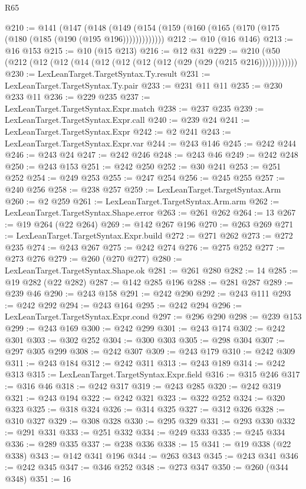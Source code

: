 \begin{lexlean}{R65}
\begin{coremodule}
@210 := @141
    (@147 (@148 (@149 (@154 (@159 (@160 (@165 (@170 (@175 (@180 (@185 (@190 (@195 @196)))))))))))))
@212 := @10 (@16 @146)
@213 := @16 @153
@215 := @10 (@15 @213)
@216 := @12 @31
@229 := @210 (@50 (@212 (@12 (@12 (@14 (@12 (@12 (@12 (@12 (@29 (@29 (@215 @216))))))))))))
@230 := LexLeanTarget.TargetSyntax.Ty.result
@231 := LexLeanTarget.TargetSyntax.Ty.pair
@233 := @231 @11 @11
@235 := @230 @233 @11
@236 := @229 @235
@237 := LexLeanTarget.TargetSyntax.Expr.match
@238 := @237 @235
@239 := LexLeanTarget.TargetSyntax.Expr.call
@240 := @239 @24
@241 := LexLeanTarget.TargetSyntax.Expr
@242 := @2 @241
@243 := LexLeanTarget.TargetSyntax.Expr.var
@244 := @243 @146
@245 := @242 @244
@246 := @243 @24
@247 := @242 @246
@248 := @243 @46
@249 := @242 @248
@250 := @243 @153
@251 := @242 @250
@252 := @30 @241
@253 := @251 @252
@254 := @249 @253
@255 := @247 @254
@256 := @245 @255
@257 := @240 @256
@258 := @238 @257
@259 := LexLeanTarget.TargetSyntax.Arm
@260 := @2 @259
@261 := LexLeanTarget.TargetSyntax.Arm.arm
@262 := LexLeanTarget.TargetSyntax.Shape.error
@263 := @261 @262
@264 := 13
@267 := @19 @264 (@22 @264)
@269 := @142 @267 @196
@270 := @263 @269
@271 := LexLeanTarget.TargetSyntax.Expr.build
@272 := @271 @262
@273 := @272 @235
@274 := @243 @267
@275 := @242 @274
@276 := @275 @252
@277 := @273 @276
@279 := @260 (@270 @277)
@280 := LexLeanTarget.TargetSyntax.Shape.ok
@281 := @261 @280
@282 := 14
@285 := @19 @282 (@22 @282)
@287 := @142 @285 @196
@288 := @281 @287
@289 := @239 @46
@290 := @243 @158
@291 := @242 @290
@292 := @243 @111
@293 := @242 @292
@294 := @243 @164
@295 := @242 @294
@296 := LexLeanTarget.TargetSyntax.Expr.cond
@297 := @296 @290
@298 := @239 @153
@299 := @243 @169
@300 := @242 @299
@301 := @243 @174
@302 := @242 @301
@303 := @302 @252
@304 := @300 @303
@305 := @298 @304
@307 := @297 @305 @299
@308 := @242 @307
@309 := @243 @179
@310 := @242 @309
@311 := @243 @184
@312 := @242 @311
@313 := @243 @189
@314 := @242 @313
@315 := LexLeanTarget.TargetSyntax.Expr.field
@316 := @315 @246
@317 := @316 @46
@318 := @242 @317
@319 := @243 @285
@320 := @242 @319
@321 := @243 @194
@322 := @242 @321
@323 := @322 @252
@324 := @320 @323
@325 := @318 @324
@326 := @314 @325
@327 := @312 @326
@328 := @310 @327
@329 := @308 @328
@330 := @295 @329
@331 := @293 @330
@332 := @291 @331
@333 := @251 @332
@334 := @249 @333
@335 := @245 @334
@336 := @289 @335
@337 := @238 @336
@338 := 15
@341 := @19 @338 (@22 @338)
@343 := @142 @341 @196
@344 := @263 @343
@345 := @243 @341
@346 := @242 @345
@347 := @346 @252
@348 := @273 @347
@350 := @260 (@344 @348)
@351 := 16

\end{coremodule}
\end{lexlean}
